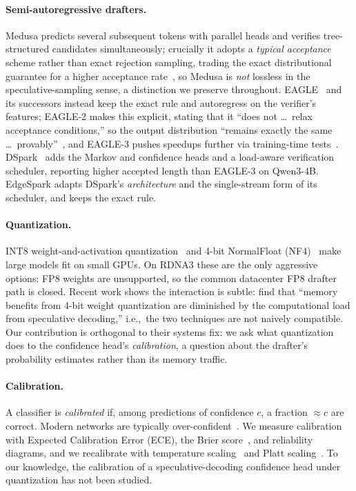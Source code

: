 \documentclass[11pt]{article}
\theoremstyle{plain}
\theoremstyle{definition}
\newcommand{\ie}{i.e.,}
\begin{document}
\paragraph{Semi-autoregressive drafters.}
Medusa predicts several subsequent tokens with parallel heads and verifies
tree-structured candidates simultaneously; crucially it adopts a \emph{typical
acceptance} scheme rather than exact rejection sampling, trading the exact
distributional guarantee for a higher acceptance rate~\citep{medusa2024}, so
Medusa is \emph{not} lossless in the speculative-sampling sense, a distinction we
preserve throughout. EAGLE~\citep{eagle2024} and its successors instead keep the
exact rule and autoregress on the verifier's features; EAGLE-2 makes this
explicit, stating that it ``does not \dots\ relax acceptance conditions,'' so the
output distribution ``remains exactly the same \dots\ provably''~\citep{eagle2_2024},
and EAGLE-3 pushes speedups further via training-time
tests~\citep{eagle3_2025}. DSpark~\citep{dspark2026} adds the Markov and
confidence heads and a load-aware verification scheduler, reporting higher
accepted length than EAGLE-3 on Qwen3-4B. EdgeSpark adapts DSpark's
\emph{architecture} and the single-stream form of its scheduler, and keeps the
exact rule.

\paragraph{Quantization.}
INT8 weight-and-activation quantization~\citep{dettmers2022} and 4-bit
NormalFloat (NF4)~\citep{dettmers2023} make large models fit on small GPUs. On
RDNA3 these are the only aggressive options: FP8 weights are unsupported, so the
common datacenter FP8 drafter path is closed. Recent work shows the interaction
is subtle: \citet{zhang2025} find that ``memory benefits from 4-bit weight
quantization are diminished by the computational load from speculative
decoding,'' \ie\ the two techniques are not naively compatible. Our contribution
is orthogonal to their systems fix: we ask what quantization does to the
confidence head's \emph{calibration}, a question about the drafter's probability
estimates rather than its memory traffic.

\paragraph{Calibration.}
A classifier is \emph{calibrated} if, among predictions of confidence $c$, a
fraction $\approx c$ are correct. Modern networks are typically
over-confident~\citep{guo2017}. We measure calibration with Expected Calibration
Error (ECE), the Brier score~\citep{brier1950}, and reliability diagrams, and we
recalibrate with temperature scaling~\citep{guo2017} and Platt
scaling~\citep{platt1999}. To our knowledge, the calibration of a
speculative-decoding confidence head under quantization has not been studied.
\end{document}
